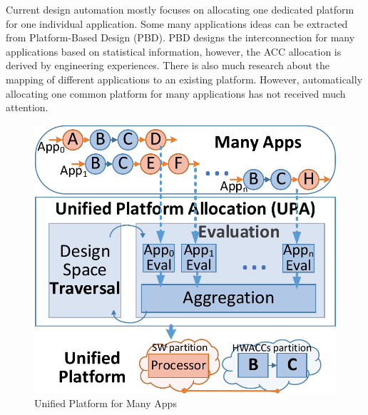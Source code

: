 Current design automation mostly focuses on allocating one dedicated platform for one individual application. 
Some many applications ideas can be extracted from Platform-Based Design (PBD)\cite{PBD}. PBD designs the interconnection for many applications based on statistical information, however, the ACC allocation is derived by engineering experiences. 
There is also much research about the mapping of different applications to an existing platform\cite{marwedel2011mapping}\cite{quan2013scenario}. However, automatically allocating one common platform for many applications has not received much attention. 


\begingroup
\setlength{\columnsep}{8pt}%
\begin{figure}
	\vspace{-4pt}
	\begin{center}
		\includegraphics[width=\linewidth]{fig/MAARflow.pdf}
	\end{center}
	\vspace{-8pt}
	\caption{Unified Platform for Many Apps}
	\label{fig:domainDSE}
	\vspace{-4pt}
\end{figure}


